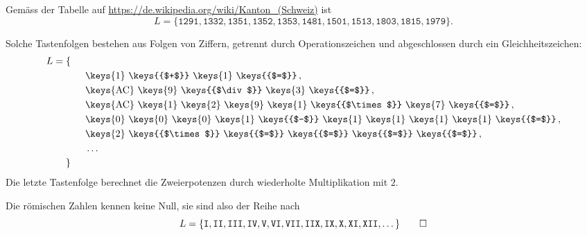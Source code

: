 \begin{loesung}
\begin{teilaufgaben}
\item Gemäss der Tabelle auf
\url{https://de.wikipedia.org/wiki/Kanton_(Schweiz)}
ist 
\[
L=\{
\texttt{1291},
\texttt{1332},
\texttt{1351},
\texttt{1352},
\texttt{1353},
\texttt{1481},
\texttt{1501},
\texttt{1513},
\texttt{1803},
\texttt{1815},
\texttt{1979}
\}.
\]
\item
Solche Tastenfolgen bestehen aus Folgen von Ziffern, getrennt durch
Operationszeichen
und abgeschlossen durch ein Gleichheitszeichen:
\begin{align*}
L=\mathstrut&\{
\\
&\qquad
\text{\keys{1} \keys{{$+$}} \keys{1} \keys{{$=$}}}\,,
\\
&\qquad
\text{\keys{AC} \keys{9} \keys{{$\div$}} \keys{3} \keys{{$=$}}}\,,
\\
&\qquad
\text{\keys{AC} \keys{1} \keys{2} \keys{9} \keys{1}
\keys{{$\times$}} \keys{7} \keys{{$=$}}}\,,
\\
&\qquad
\text{\keys{0} \keys{0} \keys{0} \keys{1}
\keys{{$-$}}
\keys{1} \keys{1} \keys{1} \keys{1}
\keys{{$=$}}}\,,
\\
&\qquad
\text{\keys{2}
\keys{{$\times$}}
\keys{{$=$}}
\keys{{$=$}}
\keys{{$=$}}
\keys{{$=$}}}\,,
\\
&\qquad\dots
\\
&\}
\end{align*}
Die letzte Tastenfolge berechnet die Zweierpotenzen durch wiederholte 
Multiplikation mit $2$.
\item
Die römischen Zahlen kennen keine Null, sie sind also der Reihe nach
\[
L=\{
\texttt{I},
\texttt{II},
\texttt{III},
\texttt{IV},
\texttt{V},
\texttt{VI},
\texttt{VII},
\texttt{IIX},
\texttt{IX},
\texttt{X},
\texttt{XI},
\texttt{XII},
\dots
\}
\qedhere
\]
\end{teilaufgaben}
\end{loesung}
